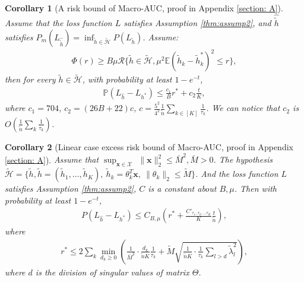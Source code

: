 \documentclass{article}
\def\vx{{\mathbf{x}}}
\def\eE{\mathbb{E}}
\def\pP{\mathbb{P}}
\newtheorem{corollary}{Corollary}
\begin{document}
\begin{corollary}[A risk bound of Macro-AUC, proof in Appendix \ref{section: A}] \label{thm: sub-root AUC}
    Assume that the loss function $L$ satisfies Assumption \ref{thm:assump2}, and $\hat{\tilde{h}}$ satisfies $P _m(L _{\hat{\tilde{h}}}) = \inf _{\tilde{h} \in \mathcal{\tilde{H}}} P(L_{\tilde{h}})$. Assume: \\
    \begin{align*}
        \Phi (r) \geq B \mu \mathcal{R} \{ \tilde{h} \in \mathcal{\tilde{H}}, \mu ^2 \eE(\tilde{h}_k - \tilde{h}_k^*)^2 \leq r \},
    \end{align*}
    then for every $\tilde{h} \in \mathcal{\tilde{H}}$, with probability at least $1 - e^{-t}$,
    \begin{align*}
        \pP (L_{\hat{h}} - L_{h^*}) \leq \frac{c_1}{B} r^* +c_2\frac{t}{K},
    \end{align*}
    where $c_1 = 704$, $c_2 = (26B + 22)c $, $c = \frac{5^2}{4^2} 
\frac{1}{\tilde{n}} \sum_{k \in [K]} \frac{1}{\tau_k} $. We can notice that $c_2$ is $O(\frac{1}{\tilde{n}} \sum_k \frac{1}{\tau_k})$.
\end{corollary}

\begin{corollary}[Linear case excess risk bound of Macro-AUC, proof in Appendix \ref{section: A}] 
\label{thm: linear comput AUC} Assume that $\sup _{\vx \in \mathcal{X}} $ $ \|\vx\|_2^2 \leq \bar{M}^2,\bar{M} > 0$. The hypothesis $\mathcal{\tilde{H}}=\{ \tilde{h},\tilde{h}=(\tilde{h}_1,\dots,\tilde{h}_K), ~\tilde{h}_k = \theta_k^T \vx, ~\|\theta_k\|_2 \leq \widetilde{M} \}$. And the loss function $L$ satisfies Assumption \ref{thm:assump2}, $C$ is a constant about $B, \mu $. Then with probability at least $1 - e^{-t}$, 
\begin{align} \label{eq:linear eq AUC}
    P (L_{\hat{h}} - L_{h^*}) \leq C_{B,\mu} (r^* + \frac{C'_{\tau_1,\tau_2,...\tau_K}}{K} \frac{ t}{\tilde{n}}),
\end{align}
where
\begin{align} \label{eq:linear r AUC}
    r^* \leq 2 \sum_k \min_{d_k \geq 0} ( \frac{1}{\bar{M}^2} \cdot \frac{d_k}{\tilde{n} K} \frac{1}{\tau_k} + \widetilde{M} \sqrt{\frac{1}{\tilde{n} K} \cdot \frac{1}{\tau_k} \sum_{l > d} \widetilde{\lambda}_{l}^2 } ),
\end{align}
where $d$ is the division of singular values of matrix $\Theta$. 
\end{corollary}
\end{document}
